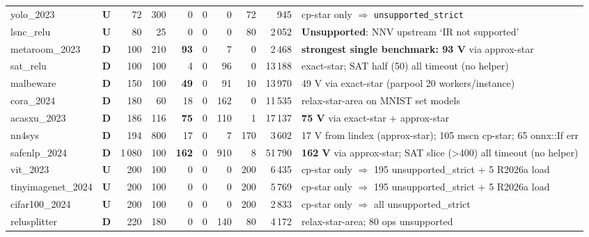 \documentclass[10pt]{beamer}
\newcommand{\sdone}{{\color{cdone}\textbf{D}}}
\newcommand{\sunsup}{{\color{cunsup}\textbf{U}}}
\begin{document}
\begin{frame}[fragile]
\begin{tabular}{l c r r r r r r r l}
yolo\_2023                        & \sunsup & 72    & 300     & 0           & 0   & 0     & 72  & 945     & cp-star only $\Rightarrow$ \texttt{unsupported\_strict} \\
lsnc\_relu                        & \sunsup & 80    & 25      & 0           & 0   & 0     & 80  & 2\,052  & \textbf{Unsupported}: NNV upstream `IR not supported' \\
metaroom\_2023                    & \sdone  & 100   & 210     & \textbf{93} & 0   & 7     & 0   & 2\,468  & \textbf{strongest single benchmark: 93 V} via approx-star \\
sat\_relu                         & \sdone  & 100   & 100     & 4           & 0   & 96    & 0   & 13\,188 & exact-star; SAT half (50) all timeout (no helper) \\
malbeware                         & \sdone  & 150   & 100     & \textbf{49} & 0   & 91    & 10  & 13\,970 & 49 V via exact-star (parpool 20 workers/instance) \\
cora\_2024                        & \sdone  & 180   & 60      & 18          & 0   & 162   & 0   & 11\,535 & relax-star-area on MNIST set models \\
acasxu\_2023                      & \sdone  & 186   & 116     & \textbf{75} & 0   & 110   & 1   & 17\,137 & \textbf{75 V} via exact-star + approx-star \\
nn4sys                            & \sdone  & 194   & 800     & 17          & 0   & 7     & 170 & 3\,602  & 17 V from lindex (approx-star); 105 mscn cp-star; 65 onnx::If err \\
safenlp\_2024                     & \sdone  & 1\,080 & 100    & \textbf{162} & 0  & 910   & 8   & 51\,790 & \textbf{162 V} via approx-star; SAT slice (\textgreater400) all timeout (no helper) \\
vit\_2023                         & \sunsup & 200   & 100     & 0           & 0   & 0     & 200 & 6\,435  & cp-star only $\Rightarrow$ 195 unsupported\_strict + 5 R2026a load \\
tinyimagenet\_2024                & \sunsup & 200   & 100     & 0           & 0   & 0     & 200 & 5\,769  & cp-star only $\Rightarrow$ 195 unsupported\_strict + 5 R2026a load \\
cifar100\_2024                    & \sunsup & 200   & 100     & 0           & 0   & 0     & 200 & 2\,833  & cp-star only $\Rightarrow$ all unsupported\_strict \\
relusplitter                      & \sdone  & 220   & 180     & 0           & 0   & 140   & 80  & 4\,172  & relax-star-area; 80 ops unsupported \\

\end{tabular}
\end{frame}
\end{document}
